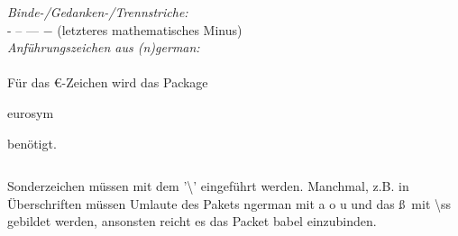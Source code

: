 \begin{frame}
\begin{columns}
\begin{column}{0.5\textwidth}
\textit{Binde-\slash Gedanken-\slash Trennstriche:} \\
- -- --- $-$ (letzteres mathematisches Minus) \\

\textit{Anführungszeichen aus (n)german:} \\
\glqq \grqq \flqq \frqq\\[5mm]
Für das \euro -Zeichen wird das Package \begin{ttfamily}eurosym\end{ttfamily}
benötigt.\\

\end{column}
\end{columns}
\medskip
\footnotesize Sonderzeichen müssen mit dem '\color{nounibaredI}\textbackslash \color{black}' eingeführt werden.
Manchmal, z.B. in \"Uberschriften m\"ussen Umlaute des Pakets ngerman mit \grqq a \grqq o
\grqq u und das \ss ~mit \color{nounibaredI} \textbackslash ss \color{black}gebildet werden, ansonsten reicht es das Packet {\ttfamily babel} einzubinden.
\end{frame}
